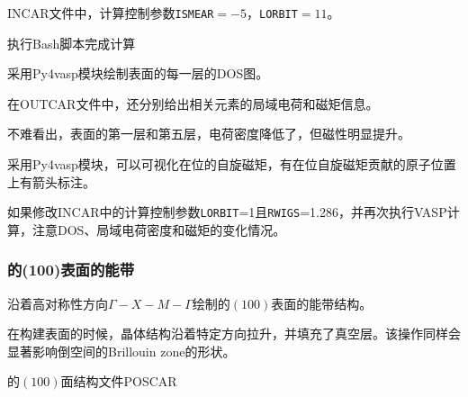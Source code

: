 \textrm{INCAR}文件中，计算控制参数\texttt{ISMEAR}$=-5$，\texttt{LORBIT}$=11$。%

执行\textrm{Bash}脚本完成计算

采用\textrm{Py4vasp}模块绘制表面的每一层的\textrm{DOS}图。%

在\textrm{OUTCAR}文件中，还分别给出相关元素的局域电荷和磁矩信息。

不难看出，表面的第一层和第五层，电荷密度降低了，但磁性明显提升。

采用\textrm{Py4vasp}模块，可以可视化在位的自旋磁矩，有在位自旋磁矩贡献的原子位置上有箭头标注。

如果修改\textrm{INCAR}中的计算控制参数\texttt{LORBIT}=1且\texttt{RWIGS}=1.286，并再次执行\textrm{VASP}计算，注意\textrm{DOS}、局域电荷密度和磁矩的变化情况。

\subsubsection{的(100)表面的能带}
沿着高对称性方向$\Gamma-X-M-\Gamma$绘制的$(100)$表面的能带结构。

在构建表面的时候，晶体结构沿着特定方向拉升，并填充了真空层。该操作同样会显著影响倒空间的\textrm{Brillouin zone}的形状。%


的$(100)$面结构文件\textrm{POSCAR}

